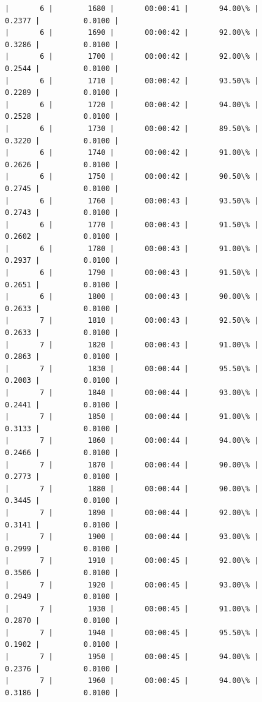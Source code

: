 \documentclass[11pt]{article}
\begin{document}
\begin{Verbatim}[commandchars=\\\{\}]
|       6 |        1680 |       00:00:41 |       94.00\% |       0.2377 |          0.0100 |
|       6 |        1690 |       00:00:42 |       92.00\% |       0.3286 |          0.0100 |
|       6 |        1700 |       00:00:42 |       92.00\% |       0.2544 |          0.0100 |
|       6 |        1710 |       00:00:42 |       93.50\% |       0.2289 |          0.0100 |
|       6 |        1720 |       00:00:42 |       94.00\% |       0.2528 |          0.0100 |
|       6 |        1730 |       00:00:42 |       89.50\% |       0.3220 |          0.0100 |
|       6 |        1740 |       00:00:42 |       91.00\% |       0.2626 |          0.0100 |
|       6 |        1750 |       00:00:42 |       90.50\% |       0.2745 |          0.0100 |
|       6 |        1760 |       00:00:43 |       93.50\% |       0.2743 |          0.0100 |
|       6 |        1770 |       00:00:43 |       91.50\% |       0.2602 |          0.0100 |
|       6 |        1780 |       00:00:43 |       91.00\% |       0.2937 |          0.0100 |
|       6 |        1790 |       00:00:43 |       91.50\% |       0.2651 |          0.0100 |
|       6 |        1800 |       00:00:43 |       90.00\% |       0.2633 |          0.0100 |
|       7 |        1810 |       00:00:43 |       92.50\% |       0.2633 |          0.0100 |
|       7 |        1820 |       00:00:43 |       91.00\% |       0.2863 |          0.0100 |
|       7 |        1830 |       00:00:44 |       95.50\% |       0.2003 |          0.0100 |
|       7 |        1840 |       00:00:44 |       93.00\% |       0.2441 |          0.0100 |
|       7 |        1850 |       00:00:44 |       91.00\% |       0.3133 |          0.0100 |
|       7 |        1860 |       00:00:44 |       94.00\% |       0.2466 |          0.0100 |
|       7 |        1870 |       00:00:44 |       90.00\% |       0.2773 |          0.0100 |
|       7 |        1880 |       00:00:44 |       90.00\% |       0.3445 |          0.0100 |
|       7 |        1890 |       00:00:44 |       92.00\% |       0.3141 |          0.0100 |
|       7 |        1900 |       00:00:44 |       93.00\% |       0.2999 |          0.0100 |
|       7 |        1910 |       00:00:45 |       92.00\% |       0.3506 |          0.0100 |
|       7 |        1920 |       00:00:45 |       93.00\% |       0.2949 |          0.0100 |
|       7 |        1930 |       00:00:45 |       91.00\% |       0.2870 |          0.0100 |
|       7 |        1940 |       00:00:45 |       95.50\% |       0.1902 |          0.0100 |
|       7 |        1950 |       00:00:45 |       94.00\% |       0.2376 |          0.0100 |
|       7 |        1960 |       00:00:45 |       94.00\% |       0.3186 |          0.0100 |

\end{Verbatim}
\end{document}
